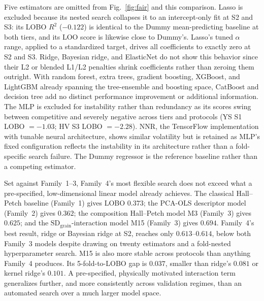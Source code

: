 \documentclass[5p,times,twocolumn]{elsarticle}
\begin{document}
Five estimators are omitted from Fig.~\ref{fig:fair} and this comparison. Lasso is excluded because its nested search collapses it to an intercept-only fit at S2 and S3: its LOBO $R^2$ ($-0.122$) is identical to the Dummy mean-predicting baseline at both tiers, and its LOO score is likewise close to Dummy's. Lasso's tuned $\alpha$ range, applied to a standardized target, drives all coefficients to exactly zero at S2 and S3. Ridge, Bayesian ridge, and ElasticNet do not show this behavior since their L2 or blended L1/L2 penalties shrink coefficients rather than zeroing them outright. With random forest, extra trees, gradient boosting, XGBoost, and LightGBM already spanning the tree-ensemble and boosting space, CatBoost and decision tree add no distinct performance improvement or additional information. The MLP is excluded for instability rather than redundancy as its scores swing between competitive and severely negative across tiers and protocols (YS S1 LOBO $=-1.03$; HV S3 LOBO $=-2.28$). NNR, the TensorFlow implementation with tunable neural architecture, shows similar volatility but is retained as MLP's fixed configuration reflects the instability in its architecture rather than a fold-specific search failure. The Dummy regressor is the reference baseline rather than a competing estimator.

Set against Family~1--3, Family~4's most flexible search does not exceed what a pre-specified, low-dimensional linear model already achieves. The classical Hall--Petch baseline (Family~1) gives LOBO $0.373$; the PCA-OLS descriptor model (Family~2) gives $0.362$; the composition Hall--Petch model M3 (Family~3) gives $0.625$; and the $\mathrm{SD}_{\mathrm{grain}}$-interaction model M15 (Family~3) gives $0.694$. Family~4's best result, ridge or Bayesian ridge at S2, reaches only $0.613$--$0.614$, below both Family~3 models despite drawing on twenty estimators and a fold-nested hyperparameter search. M15 is also more stable across protocols than anything Family~4 produces. Its 5-fold-to-LOBO gap is $0.037$, smaller than ridge's $0.081$ or kernel ridge's $0.101$. A pre-specified, physically motivated interaction term generalizes further, and more consistently across validation regimes, than an automated search over a much larger model space.
\end{document}
